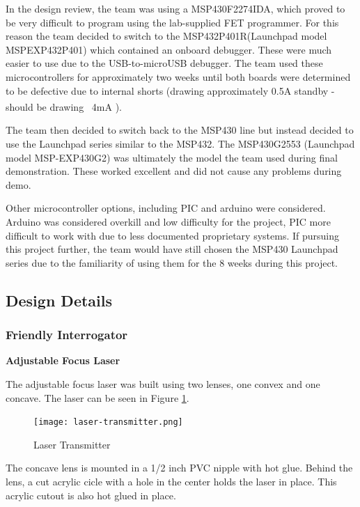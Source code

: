 \documentclass[letterpaper,10pt]{article}
\begin{document}
\begin{spacing}{1.15}
In the design review, the team was using a MSP430F2274IDA, which proved to be very difficult to program using the lab-supplied FET programmer. For this reason the team decided to switch to the MSP432P401R(Launchpad model MSPEXP432P401) which contained an onboard debugger. These were much easier to use due to the USB-to-microUSB debugger. The team used these microcontrollers for approximately two weeks until both boards were determined to be defective due to internal shorts (drawing approximately 0.5A standby -  should be drawing ~4mA \textsuperscript{\cite{MSPEXP432P401R}}).

The team then decided to switch back to the MSP430 line but instead decided to use the Launchpad series similar to the MSP432. The MSP430G2553 (Launchpad model MSP-EXP430G2) was ultimately the model the team used during final demonstration. These worked excellent and did not cause any problems during demo. 

Other microcontroller options, including PIC and arduino were considered. Arduino was considered overkill and low difficulty for the project, PIC more difficult to work with due to less documented proprietary systems. If pursuing this project further, the team would have still chosen the MSP430 Launchpad series due to the familiarity of using them for the 8 weeks during this project.


\subsection{Design Details} \label{section-design-details}


\subsubsection{Friendly Interrogator}

\hspace{5mm}\textbf{Adjustable Focus Laser}
\label{section:interrogator-adjustable-focus-laser}

The adjustable focus laser was built using two lenses, one convex and one concave. The laser can be seen in Figure \ref{fig:laser-transmitter}.

\begin{figure} [H]
	\centering
	\texttt{[image: laser-transmitter.png]}
	\caption{Laser Transmitter \label{fig:laser-transmitter}} 
\end{figure}

The concave lens is mounted in a 1/2 inch PVC nipple with hot glue. Behind the lens, a cut acrylic cicle with a hole in the center holds the laser in place. This acrylic cutout is also hot glued in place.


\end{spacing}
\end{document}
